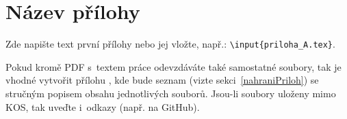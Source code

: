 \documentclass[a4paper,oneside,12pt]{book}
\begin{document}

\chapter{Název přílohy} %
Zde napište text první přílohy nebo jej vložte, např.: \texttt{\textbackslash input\{priloha\_A.tex\}}. \par Pokud kromě PDF s~textem práce odevzdáváte také samostatné soubory, tak je vhodné vytvořit přílohu , kde bude seznam  (vizte sekci~\ref{nahraniPriloh}) se stručným popisem obsahu jednotlivých souborů. Jsou-li soubory uloženy mimo KOS, tak uveďte i~odkazy (např. na GitHub).
%

\end{document}
